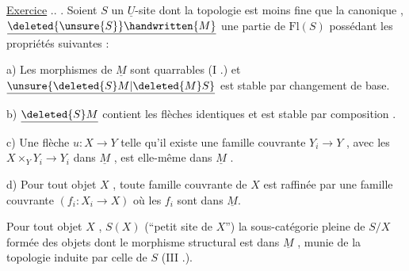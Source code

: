 \uline{Exercice} .. . Soient \(S\) un \(\underline{U}\)-site dont la topologie est moins fine que la canonique , \(\underline{\deleted{\unsure{S}}\handwritten{M}}\) une partie de \(\mathrm{Fl}(S)\) possédant les propriétés suivantes :

 a) Les morphismes de \(\underline{M}\) sont quarrables (I .) et \(\underline{\unsure{\deleted{S}M|\deleted{M}S}}\) est stable par changement de base.

 b) \(\underline{\deleted{S}M}\) contient les flèches identiques et est stable par composition .

 c) Une flèche \(u:X\to Y\) telle qu'il existe une famille couvrante \(Y_i\to Y\) , avec les \(X\times_Y Y_i\to Y_i\) dans \(\underline{M}\) , est elle-même dans \(\underline{M}\) .

 d) Pour tout objet \(X\) , toute famille couvrante de \(X\) est raffinée par une famille couvrante \((f_i:X_i\to X)\) où les \(f_i\) sont dans \(\underline{M}\).

Pour tout objet \(X\) ,  \(S(X)\) (``petit site de \(X\)'')%
%
\reversemarginpar
{}
\normalmarginpar
{} la sous-catégorie pleine de \(S/X\) formée des objets dont le morphisme structural est dans \(\underline{M}\) , munie de la topologie induite par celle de \(S\) (III .).

